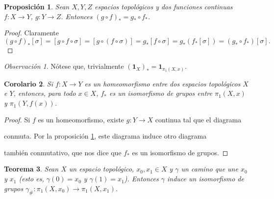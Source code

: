 \documentclass[12pt,a4paper]{book}
\newtheorem{thm}{Teorema}[section]
\newtheorem{prop}[thm]{Proposición}
\newtheorem{corol}[thm]{Corolario}
\theoremstyle{definition} \newtheorem{defn}[thm]{Definición}
\theoremstyle{definition} \newtheorem{ejemplo}[thm]{Ejemplo}
\theoremstyle{definition} \newtheorem{ejercicio}[thm]{Ejercicio}
\theoremstyle{remark} \newtheorem*{obs}{Observación}
\def\id{\mathbf{1}}
\def\gf{\pi_1}
\begin{document}
\begin{prop}\label{funtgf}
  Sean $X,Y,Z$ espacios topológicos y dos funciones continuas $f:X\rightarrow Y$, $g:Y\rightarrow Z$. Entonces $(g\circ f)_*=g_*\circ f_*$.
\end{prop}
\begin{proof}
  Claramente \[(g\circ f)_*[\sigma]=[g\circ f \circ \sigma]=[g\circ(f \circ \sigma)]=g_*[f\circ \sigma]=g_* (f_* [\sigma])=(g_* \circ f_*) [\sigma].\]
\end{proof}
\begin{obs}
  Nótese que, trivialmente $(\id_{X})_*=\id_{\gf(X,x)}$.
\end{obs}
\begin{corol}
  Si $f:X\rightarrow Y$ es un homeomorfismo entre dos espacios topológicos $X$ e $Y$, entonces, para todo $x\in X$, $f_*$ es un isomorfismo de grupos entre $\gf(X,x)$ y $\gf(Y,f(x))$.
\end{corol}
\begin{proof}
  Si $f$ es un homeomorfismo, existe $g:Y\rightarrow X$ continua tal que el diagrama
  \begin{center}
  \end{center}
  conmuta. Por la proposición \ref{funtgf}, este diagrama induce otro diagrama
  \begin{center}
  \end{center}
  también conmutativo, que nos dice que $f_*$ es un isomorfismo de grupos.
\end{proof}
\begin{thm}\label{isocamino}
  Sean $X$ un espacio topológico, $x_0,x_1\in X$ y $\gamma$ un camino que une $x_0$ y $x_1$ (esto es, $\gamma(0)=x_0$ y $\gamma(1)=x_1$). Entonces $\gamma$ induce un isomorfismo de grupos $\gamma_{\#}:\gf(X,x_0) \rightarrow \gf(X,x_1)$.
\end{thm}
\end{document}
